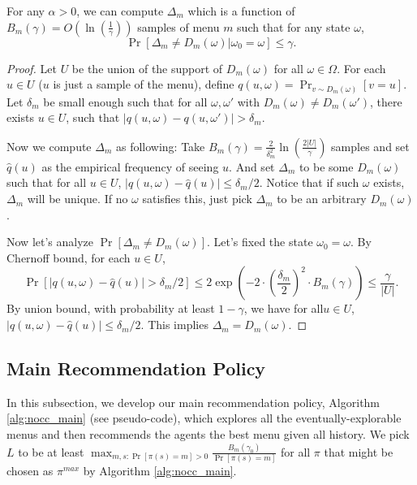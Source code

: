\begin{lemma}
\label{lem:deltam}
For any $\alpha > 0$, we can compute $\Delta_m$ which is a function of $B_m(\gamma) = O\left(\ln\left(\frac{1}{\gamma}\right)\right)$ samples of menu $m$ such that for any state $\omega$,
\[
\Pr[\Delta_m \neq D_m(\omega) | \omega_0 = \omega] \leq \gamma.
\]
\end{lemma}

\begin{proof}
Let $U$ be the union of the support of $D_m(\omega)$ for all $\omega \in \varOmega$. For each $u \in U$ ($u$ is just a sample of the menu), define $q(u,\omega) = \Pr_{v \sim D_m(\omega)}[v = u]$. Let $\delta_m$ be small enough such that for all $\omega, \omega'$ with $D_m(\omega) \neq D_m(\omega')$, there exists $u \in U$, such that $|q(u,\omega) - q(u,\omega')| > \delta_m$.

Now we compute $\Delta_m$ as following: Take $B_m(\gamma) = \frac{2}{\delta_m^2}\ln\left(\frac{2|U|}{\gamma}\right) $ samples and set $\hat{q}(u)$ as the empirical frequency of seeing $u$. And set $\Delta_m$ to be some $D_m(\omega)$ such that for all $u \in U$, $|q(u,\omega) - \hat{q}(u)| \leq \delta_m / 2$. Notice that if such $\omega$ exists, $\Delta_m$ will be unique. If no $\omega$ satisfies this, just pick $\Delta_m$ to be an arbitrary $D_m(\omega)$.

Now let's analyze $\Pr[\Delta_m \neq D_m(\omega)]$. Let's fixed the state $\omega_0 = \omega$. By Chernoff bound, for each $u \in U$,
\[
\Pr[|q(u,\omega) -\hat{q}(u)| > \delta_m/2] \leq 2\exp\left(-2 \cdot \left(\frac{\delta_m}{2}\right)^2 \cdot B_m(\gamma)\right) \leq \frac{\gamma}{|U|}.
\]
By union bound, with probability at least $1-\gamma$, we have for all$u \in U$, $|q(u,\omega) - \hat{q}(u)| \leq \delta_m / 2$. This implies $\Delta_m = D_m(\omega)$.
\end{proof}

\subsection{Main Recommendation Policy}
\label{sec:private_main}
In this subsection, we develop our main recommendation policy, Algorithm \ref{alg:nocc_main} (see pseudo-code), which explores all the eventually-explorable menus and then recommends the agents the best menu given all history. We pick $L$ to be at least $\max_{m,s:\Pr[\pi(s)=m] >0} \frac{B_m(\gamma_0)}{ \Pr[\pi(s)=m]}$ for all $\pi$ that might be chosen as $\pi^{max}$ by Algorithm \ref{alg:nocc_main}.

